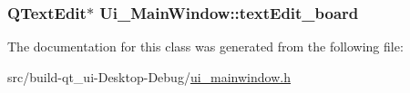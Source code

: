 \subsubsection[{\texorpdfstring{text\+Edit\+\_\+board}{textEdit_board}}]{\setlength{\rightskip}{0pt plus 5cm}Q\+Text\+Edit$\ast$ Ui\+\_\+\+Main\+Window\+::text\+Edit\+\_\+board}\hypertarget{class_ui___main_window_af13441b9fd874f1aeb2ec5cefaeb0bce}{}\label{class_ui___main_window_af13441b9fd874f1aeb2ec5cefaeb0bce}


The documentation for this class was generated from the following file\+:\begin{DoxyCompactItemize}
\item 
src/build-\/qt\+\_\+ui-\/\+Desktop-\/\+Debug/\hyperlink{ui__mainwindow_8h}{ui\+\_\+mainwindow.\+h}\end{DoxyCompactItemize}
